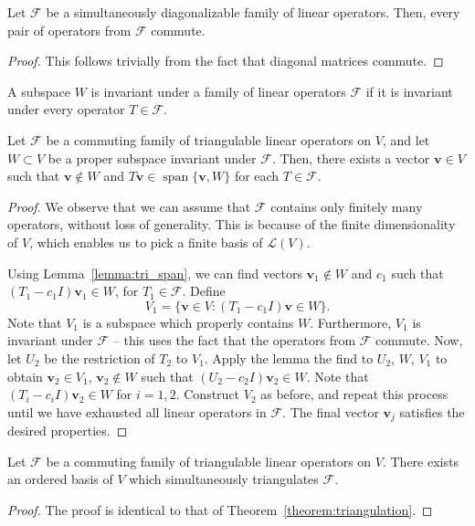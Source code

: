 \documentclass[11pt]{article}
\renewcommand{\vec}[1]{\boldsymbol{#1}}
\newcommand{\vv}{\vec{v}}
\newcommand{\alg}[1]{\mathscr{#1}}
\newcommand{\algL}{\alg{L}}
\newcommand{\algF}{\alg{F}}
\newcommand{\span}{\operatorname{span}}
\theoremstyle{definition}
\theoremstyle{remark}
\numberwithin{equation}{section}
\begin{document}
    \begin{lemma}
        Let $\algF$ be a simultaneously diagonalizable family of linear
        operators. Then, every pair of operators from $\algF$ commute.
    \end{lemma}
    \begin{proof}
        This follows trivially from the fact that diagonal matrices commute.
    \end{proof}

    \begin{definition}
        A subspace $W$ is invariant under a family of linear operators $\algF$
        if it is invariant under every operator $T \in \algF$.
    \end{definition}

    \begin{lemma}
        Let $\algF$ be a commuting family of triangulable linear operators on
        $V$, and let $W \subset V$ be a proper subspace invariant under
        $\algF$. Then, there exists a vector $\vv \in V$ such that $\vv \notin
        W$ and $T\vv \in \span\{\vv, W\}$ for each $T \in \algF$.
    \end{lemma}
    \begin{proof}
        We observe that we can assume that $\algF$ contains only finitely many
        operators, without loss of generality. This is because of the finite
        dimensionality of $V$, which enables us to pick a finite basis of $\algL(V)$.

        Using Lemma~\ref{lemma:tri_span}, we can find vectors $\vv_1 \notin W$ and
        $c_1$ such that $(T_1 - c_1I)\vv_1 \in W$, for $T_1 \in \algF$. Define
        \[
            V_1 = \{\vv \in V: (T_1 - c_1I)\vv \in W\}.
        \] Note that $V_1$ is a subspace which properly contains $W$. Furthermore,
        $V_1$ is invariant under $\algF$ -- this uses the fact that the operators
        from $\algF$ commute. Now, let $U_2$ be the restriction of $T_2$ to $V_1$.
        Apply the lemma the find to $U_2$, $W$, $V_1$ to obtain $\vv_2 \in V_1$,
        $\vv_2 \notin W$ such that $(U_2 - c_2I)\vv_2 \in W$. Note that $(T_i - c_i
        I) \vv_2 \in W$ for $i = 1, 2$. Construct $V_2$ as before, and repeat this
        process until we have exhausted all linear operators in $\algF$.  The final
        vector $\vv_j$ satisfies the desired properties.
    \end{proof}

    \begin{theorem}
        Let $\algF$ be a commuting family of triangulable linear operators on
        $V$. There exists an ordered basis of $V$ which simultaneously triangulates
        $\algF$.
    \end{theorem}
    \begin{proof}
        The proof is identical to that of Theorem~\ref{theorem:triangulation}.
    \end{proof}
    
\end{document}
